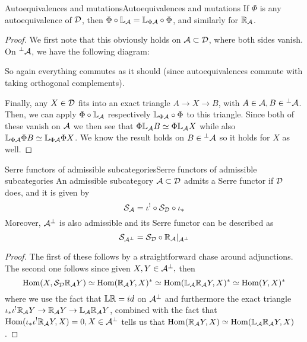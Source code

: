 \begin{corollary}{Autoequivalences and mutations}{Autoequivalences and mutations}
    If $\Phi$ is any autoequivalence of $\mathcal{D}$, then $\Phi \circ \mathbb{L}_{\mathcal{A}} = \mathbb{L}_{\Phi\mathcal{A}} \circ \Phi$, and similarly for $\mathbb{R}_{\mathcal{A}}$.
\end{corollary}
\begin{proof}
    We first note that this obviously holds on $\mathcal{A} \subset \mathcal{D}$, where both sides vanish. On $\prescript{\perp}{}{}\mathcal{A}$, we have the following diagram:
    \begin{center}
    \end{center}

    So again everything commutes as it should (since autoequivalences commute with taking orthogonal complements).

    Finally, any $X\in \mathcal{D}$ fits into an exact triangle $A\rightarrow X \rightarrow B$, with $A\in\mathcal{A}, B\in \prescript{\perp}{}{}\mathcal{A}$. Then, we can apply $\Phi \circ \mathbb{L}_{\mathcal{A}} $ respectively $\mathbb{L}_{\Phi\mathcal{A}} \circ \Phi$ to this triangle. Since both of these vanish on $\mathcal{A}$ we then see that $\Phi\mathbb{L}_{\mathcal{A}} B \simeq \Phi \mathbb{L}_{\mathcal{A}} X $ while also $\mathbb{L}_{\Phi\mathcal{A}} \Phi B \simeq \mathbb{L}_{\Phi\mathcal{A}} \Phi X$. We know the result holds on $B\in \prescript{\perp}{}{}\mathcal{A}$ so it holds for $X$ as well.

\end{proof}

\begin{lemma}{Serre functors of admissible subcategories}{Serre functors of admissible subcategories}
    An admissible subcategory $\mathcal{A}\subset \mathcal{D}$ admits a Serre functor if $\mathcal{D}$ does, and it is given by $$\mathcal{S}_{\mathcal{A}} = \iota^! \circ \mathcal{S}_{\mathcal{D}} \circ \iota_*$$
    Moreover, $\mathcal{A}^\perp$ is also admissible and its Serre functor can be described as $$\mathcal{S}_{\mathcal{A}^\perp}=\mathcal{S}_{\mathcal{D}} \circ \mathbb{R}_{\mathcal{A}}|_{\mathcal{A}^\perp}$$
  \end{lemma}
  \begin{proof}
    The first of these follows by a straightforward chase around adjunctions. The second one follows since given $X,Y \in \mathcal{A}^\perp,$ then $$\operatorname{Hom}(X, \mathcal{S}_{\mathcal{D}} \mathbb{R}_{\mathcal{A}} Y)\simeq \operatorname{Hom}(\mathbb{R}_{\mathcal{A}} Y, X)^*\simeq \operatorname{Hom}(\mathbb{L}_{\mathcal{A}} \mathbb{R}_{\mathcal{A}} Y, X)^*\simeq \operatorname{Hom}(Y,X)^*$$where we use the fact that $\mathbb{L} \mathbb{R} =id$ on $\mathcal{A}^\perp$ and furthermore the exact triangle $\iota_* \iota^! \mathbb{R}_{\mathcal{A}} Y \rightarrow \mathbb{R}_{\mathcal{A}} Y \rightarrow \mathbb{L}_{\mathcal{A}} \mathbb{R}_{\mathcal{A}} Y$, combined with the fact that $\operatorname{Hom}(\iota_* \iota^! \mathbb{R}_{\mathcal{A}} Y,X)=0, X\in \mathcal{A}^\perp$ tells us that $\operatorname{Hom}(\mathbb{R}_{\mathcal{A}} Y, X)\simeq \operatorname{Hom}(\mathbb{L}_{\mathcal{A}} \mathbb{R}_{\mathcal{A}} Y, X)$.
 \end{proof}


